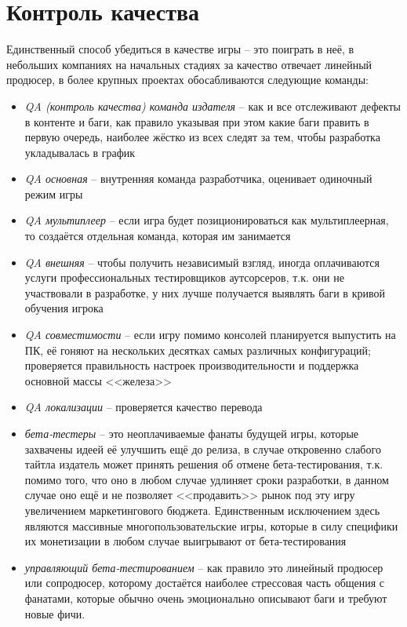 \section{Контроль качества}

Единственный способ убедиться в качестве игры -- это поиграть в неё, в небольших компаниях на начальных 
стадиях за качество отвечает линейный продюсер, в более крупных проектах обосабливаются следующие команды:
\begin{itemize}
    \item \emph{QA (контроль качества) команда издателя} -- как и все отслеживают дефекты в контенте и баги, 
        как правило указывая при этом какие баги править в первую очередь, наиболее жёстко из всех следят 
        за тем, чтобы разработка укладывалась в график
    \item \emph{QA основная} -- внутренняя команда разработчика, оценивает одиночный режим игры
    \item \emph{QA мультиплеер} -- если игра будет позиционироваться как мультиплеерная, то создаётся 
        отдельная команда, которая им занимается
    \item \emph{QA внешняя} -- чтобы получить независимый взгляд, иногда оплачиваются услуги 
        профессиональных тестировщиков аутсорсеров, т.к. они не участвовали в разработке, у них лучше 
        получается выявлять баги в кривой обучения игрока
    \item \emph{QA совместимости} -- если игру помимо консолей планируется выпустить на ПК, её гоняют на 
        нескольких десятках самых различных конфигураций; проверяется правильность настроек 
        производительности и поддержка основной массы <<железа>>
    \item \emph{QA локализации} -- проверяется качество перевода
    \item \emph{бета-тестеры} -- это неоплачиваемые фанаты будущей игры, которые захвачены идеей её улучшить 
        ещё до релиза, в случае откровенно слабого тайтла издатель может принять решения об отмене 
        бета-тестирования, т.к. помимо того, что оно в любом случае удлиняет сроки разработки, в данном 
        случае оно ещё и не позволяет <<продавить>> рынок под эту игру увеличением маркетингового бюджета. 
        Единственным исключением здесь являются массивные многопользовательские игры, которые в силу 
        специфики их монетизации в любом случае выигрывают от бета-тестирования
    \item \emph{управляющий бета-тестированием} -- как правило это линейный продюсер или сопродюсер, 
        которому достаётся наиболее стрессовая часть общения с фанатами, которые обычно очень эмоционально 
        описывают баги и требуют новые фичи.
\end{itemize}

